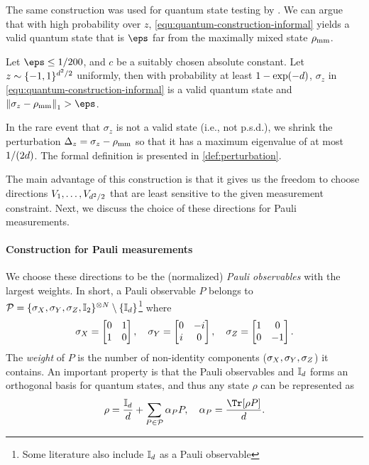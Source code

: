 The same construction was used for quantum state testing by \cite{liu2024role}. We can argue that with high probability over $z$, 
\eqref{equ:quantum-construction-informal} yields a valid quantum state that is $\eps$ far from the maximally mixed state ${\rho_{\text{mm}}}$. 
\begin{theorem}
\label{thm:valid-construction-informal}
    Let $\eps\le 1/200$, and $c$ be a suitably chosen absolute constant. Let $z\sim \{-1,1\}^{d^2/2}$ uniformly, then with probability at least $1-\exp(-d)$, $\sigma_z$ in \eqref{equ:quantum-construction-informal} is a valid quantum state and $\tracenorm{\sigma_z-\qmm}>\eps$. 
\end{theorem}
In the rare event that $\sigma_z$ is not a valid state (i.e., not p.s.d.), we shrink the perturbation $\Delta_z=\sigma_z-{\rho_{\text{mm}}}$ so that it has a maximum eigenvalue of at most $1/(2d)$. The formal definition is presented in \cref{def:perturbation}.

The main advantage of this construction is that it gives us the freedom to choose directions $V_1, \ldots, V_{d^2/2}$ that are least sensitive to the given measurement constraint. Next, we discuss the choice of these directions for Pauli measurements.

\paragraph{Construction for Pauli measurements} We choose these directions to be the (normalized) \emph{Pauli observables} with the largest weights. 
In short, a Pauli observable $P$ belongs to ${\mathcal{P}}=\{{\sigma_X}, {\sigma_Y}, {\sigma_Z}, \mathbb{I}_2\}^{\otimes {N}}\setminus\{\mathbb{I}_d\}$\footnote{Some literature also include $\mathbb{I}_d$ as a Pauli observable} where 
\begin{equation}
    {\sigma_X} = \begin{bmatrix}
    0 & 1 \\
    1 & 0
\end{bmatrix},\quad
{\sigma_Y} = \begin{bmatrix}
    0 & -i \\
    i & 0
\end{bmatrix},\quad
{\sigma_Z} = \begin{bmatrix}
    1 & 0\\
    0 & -1
\end{bmatrix}.
\label{equ:pauli-ops}
\end{equation}
The \emph{weight} of $P$ is the number of non-identity components (${\sigma_X},{\sigma_Y},{\sigma_Z}$) it contains. 
An important property is that the Pauli observables and $\mathbb{I}_d$ forms an orthogonal basis for quantum states, and thus any state $\rho$ can be represented as
\begin{equation}
    \rho = \frac{\eye_\dims}{\dims} +\sum_{P\in\pauliObsSet}\alpha_PP, \quad\alpha_P=\frac{\Tr[\rho P]}{\dims}.
    \label{equ:pauli-decomposition}
\end{equation}


